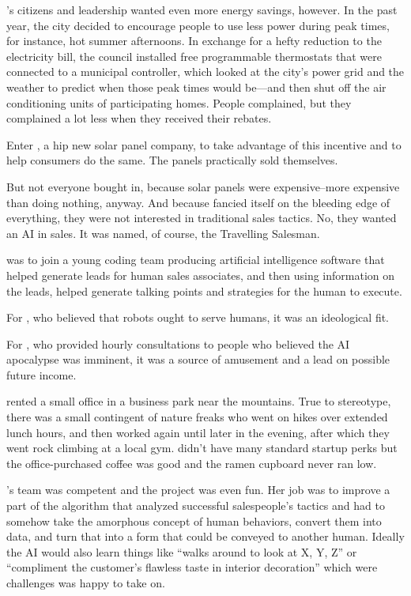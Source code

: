 \crunchyCity{}'s citizens and leadership wanted even more energy savings, however. In the past year, the city decided to encourage people to use less power during peak times, for instance, hot summer afternoons. In exchange for a hefty reduction to the electricity bill, the council installed free programmable thermostats that were connected to a municipal controller, which looked at the city's power grid and the weather to predict when those peak times would be---and then shut off the air conditioning units of participating homes. People complained, but they complained a lot less when they received their rebates.

Enter \energyCompany{}, a hip new solar panel company, to take advantage of this incentive and to help consumers do the same. The panels practically sold themselves.

But not everyone bought in, because solar panels were expensive--more expensive than doing nothing, anyway. And because \energyCompany{} fancied itself on the bleeding edge of everything, they were not interested in traditional sales tactics. No, they wanted an AI in sales. It was named, of course, the Travelling Salesman.

{\protag} was to join a young coding team producing artificial intelligence software that helped generate leads for human sales associates, and then using information on the leads, helped generate talking points and strategies for the human to execute.

For {\protag}, who believed that robots ought to serve humans, it was an ideological fit.

For {\sidetag}, who provided hourly consultations to people who believed the AI apocalypse was imminent, it was a source of amusement and a lead on possible future income.

\sectionBreak{}

\energyCompany{} rented a small office in a business park near the mountains. True to \crunchyCity{} stereotype, there was a small contingent of nature freaks who went on hikes over extended lunch hours, and then worked again until later in the evening, after which they went rock climbing at a local gym. \energyCompany{} didn't have many standard startup perks but the office-purchased coffee was good and the ramen cupboard never ran low.

{\protag}’s team was competent and the project was even fun. Her job was to improve a part of the algorithm that analyzed successful salespeople's tactics and had to somehow take the amorphous concept of human behaviors, convert them into data, and turn that into a form that could be conveyed to another human. Ideally the AI would also learn things like ``walks around to look at X, Y, Z'' or ``compliment the customer's flawless taste in interior decoration'' which were challenges {\protag} was happy to take on.

